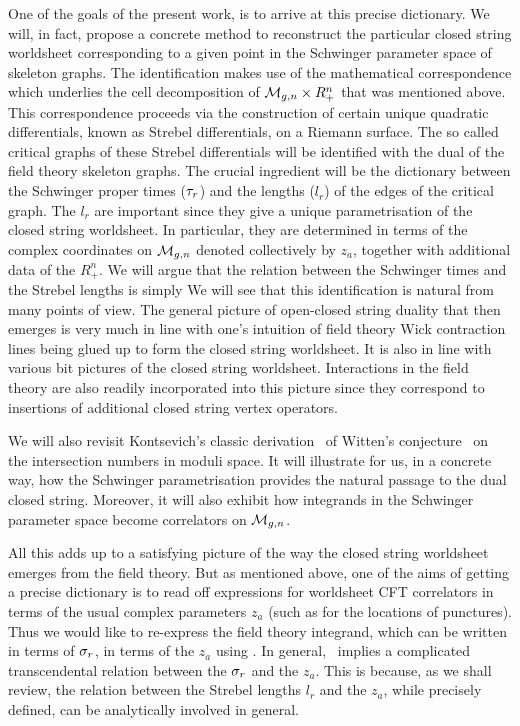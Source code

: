 One of the goals of
the present work, is to arrive at this precise dictionary. 
We will, in fact, propose a concrete method to reconstruct the 
particular closed string worldsheet corresponding to a given point in the 
Schwinger parameter space of skeleton graphs. 
The identification makes use of the mathematical 
correspondence which underlies the cell decomposition of 
${\cal M}_{g,n}\times R_{+}^n$ that was mentioned above. This correspondence
proceeds via the construction of certain unique quadratic differentials,
known as Strebel differentials, on a Riemann surface. The so called 
critical graphs of these Strebel differentials will be identified with the 
dual of the field theory skeleton graphs. The crucial ingredient will be 
the dictionary between the Schwinger proper times (${\tau}_r$)
and the lengths ($l_r$) of the 
edges of the critical graph. The $l_r$ are important since
they give a unique parametrisation 
of the closed string worldsheet. In particular, they are 
determined in terms of the complex coordinates on ${\cal M}_{g,n}$
denoted collectively by $z_a$, together with additional data of the
$ R_{+}^n$.
We will argue 
that the relation between the Schwinger times and the Strebel lengths 
is simply 
%
\eqn{}
% 
We will see that this identification is natural from many points
of view. The general picture of open-closed string duality that then 
emerges is very much in line with one's intuition of field theory Wick 
contraction lines being glued up to form the closed string worldsheet. 
It is also in line with various bit pictures of the closed string 
worldsheet. Interactions in the field theory 
are also readily incorporated into this picture since they 
correspond to insertions of additional closed string vertex operators.


We will also revisit Kontsevich's classic 
derivation \kont\ of Witten's conjecture \witint\ on the intersection numbers 
in moduli space. It will illustrate for us, in a concrete way, 
how the Schwinger parametrisation provides the natural passage 
to the dual closed string. Moreover, it will also  
exhibit how integrands in the Schwinger 
parameter space become correlators on ${\cal M}_{g,n}$. 


All this adds up to a satisfying picture of the way the closed string 
worldsheet emerges from the field theory. But as mentioned above, one of the 
aims of getting a precise dictionary
is to read off expressions for worldsheet CFT correlators in terms of the 
usual complex parameters $z_a$ (such as for the locations of punctures).
Thus we would like to re-express the 
field theory integrand, which can be written in terms of ${\sigma}_r$, 
in terms of the $z_a$ using \dic . In general, \dic\ implies a complicated 
transcendental relation between the ${\sigma}_r$ and the $z_a$. This 
is because, as we shall review, the relation between the Strebel lengths
$l_r$ and the $z_a$, while precisely defined, can be analytically involved
in general.

